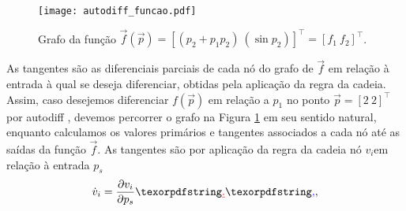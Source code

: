       \begin{figure}
        \begin{center}
          \texttt{[image: autodiff\_funcao.pdf]}
        \end{center}
        \caption{Grafo da função $\vec{f}(\vec{p}) = \left[(p_2 + p_1 p_2)\ (\sin{p_2})\right]^\top = \left[f_1\ f_2\right]^\top$.}
        \label{f:autodiff_funcao}
      \end{figure}

      \DIFdelbegin {}\DIFdelend As tangentes são as diferenciais parciais de cada nó do grafo de $\vec{f}$ em relação à entrada à qual se deseja diferenciar, obtidas pela aplicação da regra da cadeia. \DIFaddbegin {}\DIFaddend Assim, caso desejemos diferenciar $f(\vec{p})$ em relação a $p_1$ no ponto $\vec{p} = [2\ 2]^\top$ por autodiff \DIFaddbegin {}\DIFaddend , devemos percorrer o grafo na Figura \ref{f:autodiff_funcao} em seu sentido natural, enquanto calculamos os valores primários e tangentes associados a cada nó até as saídas da função $\vec{f}$. As tangentes \DIFaddbegin {}\DIFaddend são \DIFdelbegin {}\DIFdelend \DIFaddbegin {}\DIFaddend por aplicação da regra da cadeia \DIFdelbegin {}\DIFdelend \DIFaddbegin {}\DIFaddend nó $v_i$\DIFdelbegin {}\DIFdelend \DIFaddbegin {}\DIFaddend em relação à entrada $p_s$\DIFdelbegin {}\DIFdelend \DIFaddbegin \DIFadd{:
      }\DIFaddend \begin{equation} \label{e:autodiff_direta_tangente}
        \dot{v}_i = \frac{\partial v_i}{\partial p_s}
        \DIFdelbegin \DIFdel{.
      }\DIFdelend \DIFaddbegin \DIFadd{,
      }\DIFaddend \end{equation}


